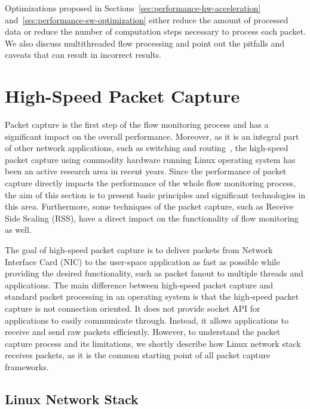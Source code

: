 Optimizations proposed in Sections~\ref{sec:performance-hw-acceleration} and~\ref{sec:performance-sw-optimization} either reduce the amount of processed data or reduce the number of computation steps necessary to process each packet. We also discuss multithreaded flow processing and point out the pitfalls and caveats that can result in incorrect results.


\section{High-Speed Packet Capture}\label{sec:performance-capture}

Packet capture is the first step of the flow monitoring process and has a significant impact on the overall performance. Moreover, as it is an integral part of other network applications, such as switching and routing~\cite{Kawashima-2016-Host}, the high-speed packet capture using commodity hardware running Linux operating system has been an active research area in recent years. Since the performance of packet capture directly impacts the performance of the whole flow monitoring process, the aim of this section is to present basic principles and significant technologies in this area. Furthermore, some techniques of the packet capture, such as Receive Side Scaling (RSS), have a direct impact on the functionality of flow monitoring as well.

The goal of high-speed packet capture is to deliver packets from Network Interface Card (NIC) to the user-space application as fast as possible while providing the desired functionality, such as packet fanout to multiple threads and applications. The main difference between high-speed packet capture and standard packet processing in an operating system is that the high-speed packet capture is not connection oriented. It does not provide socket API for applications to easily communicate through. Instead, it allows applications to receive and send raw packets efficiently. However, to understand the packet capture process and its limitations, we shortly describe how Linux network stack receives packets, as it is the common starting point of all packet capture frameworks.

\subsection{Linux Network Stack}

